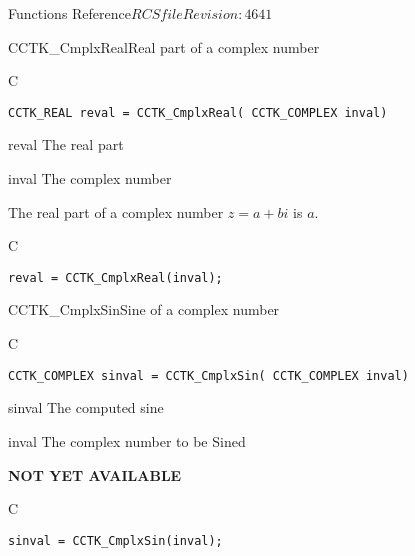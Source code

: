 \begin{cactuspart}{ Functions Reference}{$RCSfile$}{$Revision: 4641 $}
\begin{FunctionDescription}{CCTK\_CmplxReal}{Real part of a complex number}
\label{CCTK-CmplxReal}
\begin{SynopsisSection}
\begin{Synopsis}{C}
\begin{verbatim}CCTK_REAL reval = CCTK_CmplxReal( CCTK_COMPLEX inval)\end{verbatim}
\end{Synopsis}
\end{SynopsisSection}
\begin{ParameterSection}
\begin{Parameter}{reval}
The real part
\end{Parameter}
\begin{Parameter}{inval}
The complex number
\end{Parameter}
\end{ParameterSection}
\begin{Discussion}
The real part of a complex number $z=a+bi$ is $a$.
\end{Discussion}
\begin{ExampleSection}
\begin{Example}{C}
\begin{verbatim}
reval = CCTK_CmplxReal(inval);
\end{verbatim}
\end{Example}
\end{ExampleSection}
\end{FunctionDescription}

\begin{FunctionDescription}{CCTK\_CmplxSin}{Sine of a complex number}
\label{CCTK-CmplxSin}
\begin{SynopsisSection}
\begin{Synopsis}{C}
\begin{verbatim}CCTK_COMPLEX sinval = CCTK_CmplxSin( CCTK_COMPLEX inval)\end{verbatim}
\end{Synopsis}
\end{SynopsisSection}
\begin{ParameterSection}
\begin{Parameter}{sinval}
The computed sine
\end{Parameter}
\begin{Parameter}{inval}
The complex number to be Sined
\end{Parameter}
\end{ParameterSection}
\begin{Discussion}
{\bf NOT YET AVAILABLE}
\end{Discussion}
\begin{ExampleSection}
\begin{Example}{C}
\begin{verbatim}
sinval = CCTK_CmplxSin(inval);
\end{verbatim}
\end{Example}
\end{ExampleSection}
\end{FunctionDescription}


\end{cactuspart}
